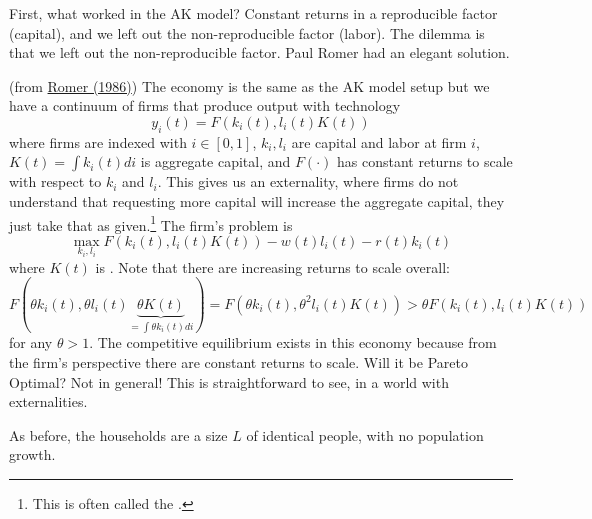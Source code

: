 \documentclass[10pt]{article}
\begin{document}
	
	\begin{remark}
		First, what worked in the AK model? Constant returns in a reproducible factor (capital), and we left out the non-reproducible factor (labor). The dilemma is that we left out the non-reproducible factor. Paul Romer had an elegant solution.
	\end{remark}
\begin{model}
	 (from \href{https://extranet.parisschoolofeconomics.eu/docs/darcillon-thibault/paul-romer-increasing-returns-and-long-run-growth.pdf}{Romer (1986)}) The economy is the same as the AK model setup but we have a continuum of firms that produce output with technology \[y_i(t) = F(k_i(t),l_i(t)K(t))\]where firms are indexed with $i \in [0,1]$, $k_i,l_i$ are capital and labor at firm $i$, $K(t) = \int k_i(t)di$ is aggregate capital, and $F(\cdot)$ has constant returns to scale with respect to $k_i$ and $l_i$. This gives us an externality, where firms do not understand that requesting more capital will increase the aggregate capital, they just take that as given.\footnote{This is often called the .} The firm's problem is \[\max_{k_i,l_i} F(k_i(t),l_i(t)K(t)) - w(t)l_i(t) - r(t)k_i(t)\]where $K(t)$ is . Note that there are increasing returns to scale overall: \[F(\theta k_i(t),\theta l_i(t)\underbrace{\theta K(t)}_{=\int \theta k_i(t)di}) = F(\theta k_i(t),\theta^2 l_i(t) K(t)) > \theta F( k_i(t), l_i(t) K(t))\]for any $\theta > 1$. The competitive equilibrium exists in this economy because from the firm's perspective there are constant returns to scale. Will it be Pareto Optimal? Not in general! This is straightforward to see, in a world with externalities. 
	
	As before, the households are a size $L$ of identical people, with no population growth.
	

\end{model}
\end{document}

